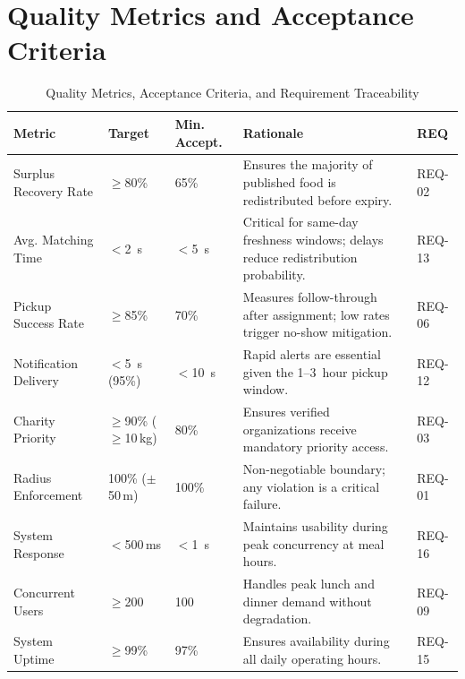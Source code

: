 \documentclass[9pt,conference]{IEEEtran}
\begin{document}
\section{Quality Metrics and Acceptance Criteria}
\label{app:qa-metrics}

\begin{table}[htbp]
\centering
\small
\begin{threeparttable}
\caption{Quality Metrics, Acceptance Criteria, and Requirement Traceability}
\label{tab:qa_metrics}
\begin{tabularx}{\textwidth}{@{} l l l X l @{}}
\toprule
\textbf{Metric} & \textbf{Target} & \textbf{Min. Accept.} & \textbf{Rationale} & \textbf{REQ} \\
\midrule
Surplus Recovery Rate     & $\geq$80\%          & 65\%          & Ensures the majority of published food is redistributed before expiry.                     & REQ-02 \\
Avg. Matching Time         & $<$2~s              & $<$5~s        & Critical for same-day freshness windows; delays reduce redistribution probability.          & REQ-13 \\
Pickup Success Rate         & $\geq$85\%          & 70\%          & Measures follow-through after assignment; low rates trigger no-show mitigation.             & REQ-06 \\
Notification Delivery       & $<$5~s (95\%)       & $<$10~s       & Rapid alerts are essential given the 1–3~hour pickup window.                               & REQ-12 \\
Charity Priority            & $\geq$90\% ($\geq$10\,kg) & 80\%    & Ensures verified organizations receive mandatory priority access.                           & REQ-03 \\
Radius Enforcement          & 100\% ($\pm$50\,m)  & 100\%         & Non-negotiable boundary; any violation is a critical failure.                               & REQ-01 \\
System Response             & $<$500\,ms          & $<$1~s        & Maintains usability during peak concurrency at meal hours.                                 & REQ-16 \\
Concurrent Users            & $\geq$200           & 100           & Handles peak lunch and dinner demand without degradation.                                  & REQ-09 \\
System Uptime               & $\geq$99\%          & 97\%          & Ensures availability during all daily operating hours.                                     & REQ-15 \\

\end{tabularx}
\end{threeparttable}
\end{table}
\end{document}
